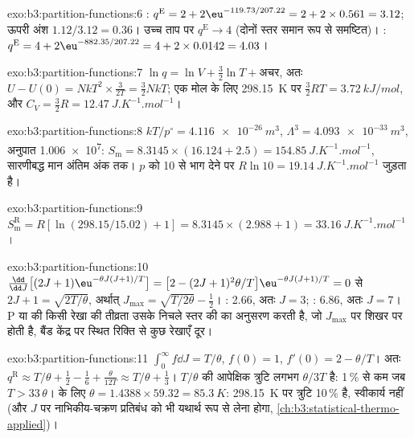 \begin{solution}{exo:b3:partition-functions:6}
: $q^{\mathrm E} = 2 + 2\eu^{-119.73/207.22} = 2 + 2 \times 0.561 = 3.12$; ऊपरी अंश $1.12/3.12
= 0.36$। उच्च ताप पर $q^{\mathrm E} \to 4$ (दोनों स्तर समान रूप से समष्टित)। :
$q^{\mathrm E} = 4 + 2\eu^{-882.35/207.22} = 4 + 2 \times 0.0142 = 4.03$।
\end{solution}

\begin{solution}{exo:b3:partition-functions:7}
$\ln q = \ln V + \frac32\ln T + \text{अचर}$, अतः $U - U(0) = NkT^2 \times \frac{3}{2T} = \frac32NkT$; एक
मोल के लिए \qty{298.15}{K} पर $\frac32RT = \qty{3.72}{kJ/mol}$, और $C_V = \frac32R = \qty{12.47}{J.K^{-1}.mol^{-1}}$।
\end{solution}

\begin{solution}{exo:b3:partition-functions:8}
$kT/p^\circ = \qty{4.116e-26}{m^3}$, $\Lambda^3 = \qty{4.093e-33}{m^3}$, अनुपात \num{1.006e7}:
$S_{\mathrm m} = 8.3145 \times (16.124 + 2.5) = \qty{154.85}{J.K^{-1}.mol^{-1}}$, सारणीबद्ध मान अंतिम
अंक तक। $p$ को 10 से भाग देने पर $R\ln10 = \qty{19.14}{J.K^{-1}.mol^{-1}}$ जुड़ता है।
\end{solution}

\begin{solution}{exo:b3:partition-functions:9}
$S^{\mathrm R}_{\mathrm m} = R[\ln(298.15/15.02) + 1] = 8.3145 \times (2.988 + 1) = \qty{33.16}{J.K^{-1}.mol^{-1}}$।
\end{solution}

\begin{solution}{exo:b3:partition-functions:10}
$\frac{\dd}{\dd J}\bigl[(2J+1)\eu^{-\theta J(J+1)/T}\bigr] = \bigl[2 - (2J+1)^2\theta/T\bigr]\eu^{-\theta J(J+1)/T} = 0$ से
$2J + 1 = \sqrt{2T/\theta}$, अर्थात् $J_{\max} = \sqrt{T/2\theta} - \frac12$। : 2.66, अतः $J = 3$; :
6.86, अतः $J = 7$। P या  की किसी रेखा की तीव्रता उसके निचले स्तर की
 का अनुसरण करती है, जो $J_{\max}$ पर शिखर पर होती है, बैंड केंद्र पर स्थित रिक्ति से
कुछ रेखाएँ दूर।
\end{solution}

\begin{solution}{exo:b3:partition-functions:11}
$\int_0^\infty f\dd J = T/\theta$, $f(0) = 1$, $f'(0) = 2 - \theta/T$। अतः $q^{\mathrm R} \approx T/\theta + \frac12 -
\frac16 + \frac{\theta}{12T} \approx T/\theta + \frac13$। $T/\theta$ की आपेक्षिक त्रुटि लगभग $\theta/3T$ है:
1\,\% से कम जब $T > 33\,\theta$।  के लिए $\theta = 1.4388 \times 59.32 = \qty{85.3}{K}$:
\qty{298.15}{K} पर त्रुटि 10\,\% है, स्वीकार्य नहीं (और $J$ पर नाभिकीय-चक्रण
प्रतिबंध को भी यथार्थ रूप से लेना होगा, \cref{ch:b3:statistical-thermo-applied})।
\end{solution}

